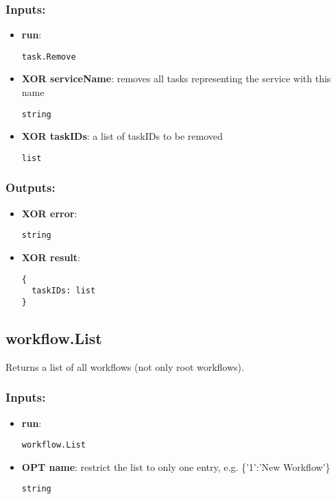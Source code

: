 \subsubsection*{Inputs:}
\begin{itemize}
    \item \textbf{run}: 
\begin{lstlisting}
task.Remove
\end{lstlisting}
    \item \textbf{XOR serviceName}: removes all tasks representing the service with this name
\begin{lstlisting}
string
\end{lstlisting}
    \item \textbf{XOR taskIDs}: a list of taskIDs to be removed
\begin{lstlisting}
list
\end{lstlisting}
  \end{itemize}

\subsubsection*{Outputs:}
\begin{itemize}
    \item \textbf{XOR error}: 
\begin{lstlisting}
string
\end{lstlisting}
    \item \textbf{XOR result}: 
\begin{lstlisting}
{
  taskIDs: list
}
\end{lstlisting}
  \end{itemize}

\subsection{workflow.List}
\label{ch:builtinservices:workflow.List}
Returns a list of all workflows (not only root workflows).
\subsubsection*{Inputs:}
\begin{itemize}
    \item \textbf{run}: 
\begin{lstlisting}
workflow.List
\end{lstlisting}
    \item \textbf{OPT name}: restrict the list to only one entry, e.g. \{'1':'New Workflow'\}
\begin{lstlisting}
string
\end{lstlisting}
  \end{itemize}

